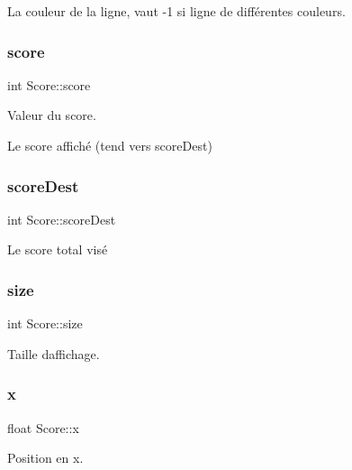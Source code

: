 La couleur de la ligne, vaut -\/1 si ligne de différentes couleurs. 

\mbox{\label{struct_score_a331b0927105c83ba760954eff6cf9fe9}} 
\subsubsection{\texorpdfstring{score}{score}}
{\footnotesize\ttfamily int Score\+::score}



Valeur du score. 

Le score affiché (tend vers score\+Dest) \mbox{\label{struct_score_ae91e6e17b08d8e57fa76ef5d876d3159}} 
\subsubsection{\texorpdfstring{score\+Dest}{scoreDest}}
{\footnotesize\ttfamily int Score\+::score\+Dest}



Le score total visé 

\mbox{\label{struct_score_aeb05476bfb3d5448f117479a0d5c1bf9}} 
\subsubsection{\texorpdfstring{size}{size}}
{\footnotesize\ttfamily int Score\+::size}



Taille d\textquotesingle{}affichage. 

\mbox{\label{struct_score_a950587a996128c5cf8899382bb811448}} 
\subsubsection{\texorpdfstring{x}{x}}
{\footnotesize\ttfamily float Score\+::x}



Position en x. 

\mbox{\label{struct_score_a6e160578d4db594b629b9b01c6e041b8}} 
